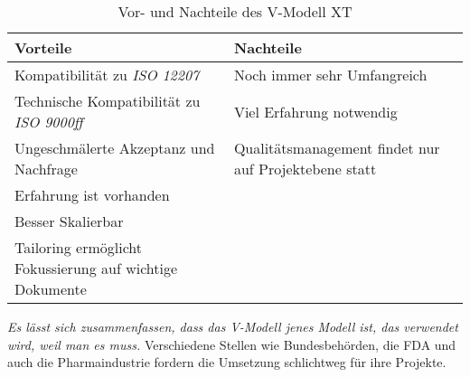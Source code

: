 \begin{table}[H]
    \centering
    \begin{tabulary}{\textwidth}{|>{\centering}p{0.5\textwidth}|p{0.5\textwidth}|}
    \hline 
     Vorteile & Nachteile \\ 
    \hline 
    Kompatibilität zu \textit{ISO 12207} & Noch immer sehr Umfangreich \\
    \hline 
    Technische Kompatibilität zu \textit{ISO 9000ff} & Viel Erfahrung notwendig \\
    \hline
    Ungeschmälerte Akzeptanz und Nachfrage & Qualitätsmanagement findet nur auf Projektebene statt \\
    \hline
    Erfahrung ist vorhanden &  \\ 
    \hline
    Besser Skalierbar &  \\ 
    \hline
    Tailoring ermöglicht Fokussierung auf wichtige Dokumente &  \\
    \hline
    \end{tabulary} 
    \caption[Vor- und Nachteile des V-Modell XT]{Vor- und Nachteile des V-Modell XT}
    \label{tabelle_VModellXTVorNachteile}
\end{table}

\textit{Es lässt sich zusammenfassen, dass das V-Modell jenes Modell ist, das verwendet wird, weil man es muss.} Verschiedene Stellen wie Bundesbehörden, die FDA und auch die Pharmaindustrie fordern die Umsetzung schlichtweg für ihre Projekte.